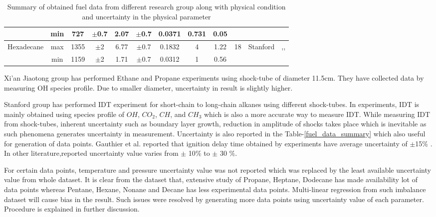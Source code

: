 \documentclass[preprint,12pt]{elsarticle}
\begin{document}
\begin{table}[]
{{{{\begin{tabular}{|c|c|c|c|c|c|c|c|c|c|c|c|}
						& min & 727 & $\pm$0.7 & 2.07 & $\pm$0.7 & 0.0371 & 0.731 & 0.05 &  &  &  \\ 
						\hline
						\multirow{2}{*}{Hexadecane} & max & 1355 & $\pm$2 & 6.77 & $\pm$0.7 & 0.1832 & 4 & 1.22 & \multirow{2}{*}{18} & \multirow{2}{*}{Stanford} & \multirow{2}{*}{\cite{n_hexadecane},\cite{ hexadecane_diesel},\cite{Haylett_2011_thesis}} \\ \cline{2-9}
						& min & 1159 &$\pm$2 & 1.71 & $\pm$0.7 & 0.0312 & 1 & 0.56 &  &  &  \\ 
						\hline
					\end{tabular}}}}}
					\hspace{0.5cm}
					\vspace{0.5cm}
					\caption{\label{fuel_data_summary}Summary of obtained fuel data from different research group along with physical condition and uncertainty in the physical parameter }
					\label{fuel_table}
					\end{table}
				
				Xi’an Jiaotong group has performed Ethane and Propane experiments using shock-tube of diameter 11.5cm. They have collected data by measuring OH species profile. Due to smaller diameter, uncertainty in result is slightly higher. 
					
				 Stanford group has performed IDT experiment for short-chain to long-chain alkanes using different shock-tubes. In experiments, IDT is mainly obtained using species profile of $OH$, $CO_2$, $CH$, and $CH_3$ which is also a more accurate way to measure IDT. While measuring IDT from shock-tubes, inherent uncertainty such as boundary layer growth, reduction in amplitude of shocks takes place which is inevitable as such phenomena generates uncertainty  in measurement. Uncertainty is also reported in the Table-\ref{fuel_data_summary} which also useful for generation of data points. Gauthier et al. reported that ignition delay time obtained by experiments have average uncertainty of $\pm$15\% \cite{blend_surrogate_fuels}. In other literature,reported uncertainty value varies from $\pm$ 10$\%$ to $\pm$ 30 $\%$. 
				 
				 For certain data points, temperature and pressure uncertainty value was not reported which was replaced by the least available uncertainty value from whole dataset. It is clear from the dataset that, extensive study of Propane, Heptane, Dodecane has made availability lot of data points  whereas Pentane, Hexane, Nonane and Decane has less experimental data points. Multi-linear regression from such imbalance dataset will cause bias in the result. Such issues were resolved by generating more data points using uncertainty value of each parameter. Procedure is explained in further discussion.
				 
\end{document}
